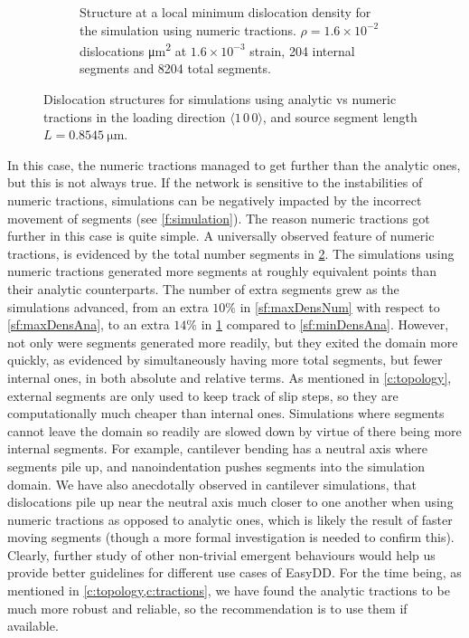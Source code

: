 \begin{figure}
\begin{subfigure}[t]{0.45\linewidth}
        \caption[Structure at a local minimum dislocation density for the simulation using analytic tractions.]{Structure at a local minimum dislocation density for the simulation using numeric tractions. $\rho = 1.6\times 10^{-2}$ dislocations \si{\micro\metre^{2}} at $1.6 \times 10^{-3}$ strain, 204 internal segments and 8204 total segments.}
        \label{sf:minDensNum}
    \end{subfigure}
    \caption{Dislocation structures for simulations using analytic vs numeric tractions in the loading direction $\langle 1\, 0\, 0\rangle$, and source segment length $L = \SI{0.8545}{\micro\metre}$.}
    \label{f:minMaxDens}
\end{figure}

In this case, the numeric tractions managed to get further than the analytic ones, but this is not always true. If the network is sensitive to the instabilities of numeric tractions, simulations can be negatively impacted by the incorrect movement of segments (see \cref{f:simulation}). The reason numeric tractions got further in this case is quite simple. A universally observed feature of numeric tractions, is evidenced by the total number segments in \cref{f:minMaxDens}. The simulations using numeric tractions generated more segments at roughly equivalent points than their analytic counterparts. The number of extra segments grew as the simulations advanced, from an extra $10\%$ in \cref{sf:maxDensNum} with respect to \cref{sf:maxDensAna}, to an extra $14\%$ in \cref{sf:minDensNum} compared to \cref{sf:minDensAna}. However, not only were segments generated more readily, but they exited the domain more quickly, as evidenced by simultaneously having more total segments, but fewer internal ones, in both absolute and relative terms. As mentioned in \cref{c:topology}, external segments are only used to keep track of slip steps, so they are computationally much cheaper than internal ones. Simulations where segments cannot leave the domain so readily are slowed down by virtue of there being more internal segments. For example, cantilever bending has a neutral axis where segments pile up, and nanoindentation pushes segments into the simulation domain. We have also anecdotally observed in cantilever simulations, that dislocations pile up near the neutral axis much closer to one another when using numeric tractions as opposed to analytic ones, which is likely the result of faster moving segments (though a more formal investigation is needed to confirm this). Clearly, further study of other non-trivial emergent behaviours would help us provide better guidelines for different use cases of EasyDD. For the time being, as mentioned in \cref{c:topology,c:tractions}, we have found the analytic tractions to be much more robust and reliable, so the recommendation is to use them if available.

